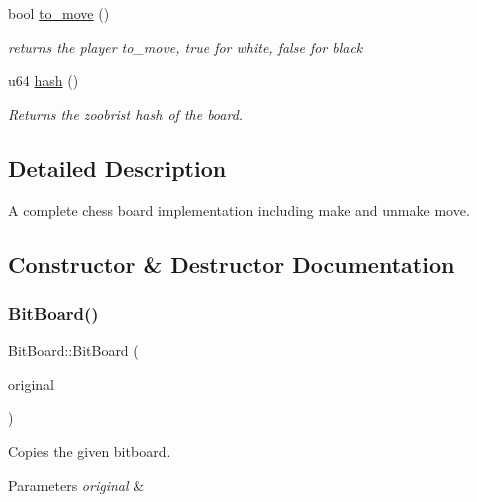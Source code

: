 \begin{DoxyCompactItemize}
bool \hyperlink{classBitBoard_a9a020e6d88fdedce0de800680abec2e7}{to\+\_\+move} ()
\begin{DoxyCompactList}\small\item\em returns the player to\+\_\+move, true for white, false for black \end{DoxyCompactList}\item 
u64 \hyperlink{classBitBoard_a0f58ac22e78e0045776e2ff0d6401d8e}{hash} ()
\begin{DoxyCompactList}\small\item\em Returns the zoobrist hash of the board. \end{DoxyCompactList}\end{DoxyCompactItemize}


\subsection{Detailed Description}
A complete chess board implementation including make and unmake move. 

\subsection{Constructor \& Destructor Documentation}
\mbox{\label{classBitBoard_aeaa1a16349090d393b00decbfe8eb6a6}} 
\subsubsection{\texorpdfstring{Bit\+Board()}{BitBoard()}\hspace{0.1cm}{\footnotesize\ttfamily [1/2]}}
{\footnotesize\ttfamily Bit\+Board\+::\+Bit\+Board (\begin{DoxyParamCaption}\item[{const \hyperlink{classBitBoard}{Bit\+Board} \&}]{original }\end{DoxyParamCaption})\hspace{0.3cm}{\ttfamily [inline]}}



Copies the given bitboard. 


\begin{DoxyParams}{Parameters}
{\em original} & \\
\hline
\end{DoxyParams}
\mbox{\label{classBitBoard_aad0762329ff5f8455e177a6b58fbc64e}} 
